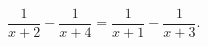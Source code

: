\begin{ex}[type=equation]
	\begin{condition}
		$\dfrac{1}{x + 2} - \dfrac{1}{x + 4} = \dfrac{1}{x  + 1} - \dfrac{1}{x + 3}.$
	\end{condition}
\end{ex}